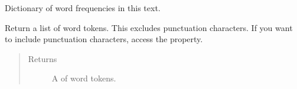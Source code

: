 \documentclass[letterpaper,10pt,english]{sphinxmanual}
\begin{document}
\begin{fulllineitems}
\begin{fulllineitems}
\label{api_reference:textblob_de.blob.TextBlobDE.word_counts}
Dictionary of word frequencies in this text.

\end{fulllineitems}


\begin{fulllineitems}
\label{api_reference:textblob_de.blob.TextBlobDE.words}
Return a list of word tokens. This excludes punctuation characters.
If you want to include punctuation characters, access the 
property.
\begin{quote}\begin{description}
\item[{Returns}] \leavevmode
A {\hyperref[api_reference:textblob_de.blob.WordList]{}} of word tokens.

\end{description}\end{quote}

\end{fulllineitems}


\end{fulllineitems}

\end{document}
